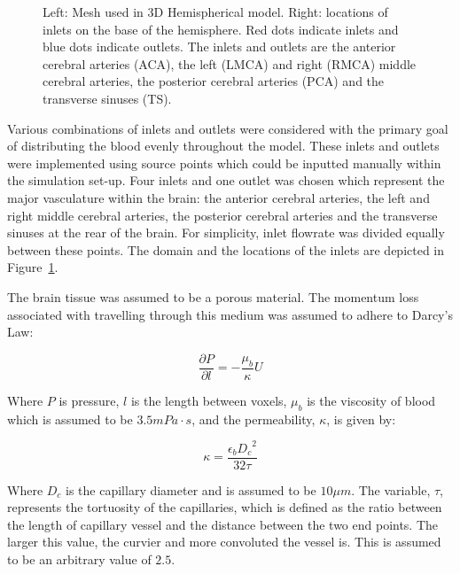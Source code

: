 \documentclass[11pt,english,a4paper,twoside,openright]{report}
\begin{document}
{{{{{{{{\begin{figure}[h]
\begin{subfigure}[b]{0.45\textwidth}
	\end{subfigure}
	\caption[Mesh and domain for 3D hemispherical model with the location of inlets and outlets]{Left: Mesh used in 3D Hemispherical model. Right: locations of inlets on the base of the hemisphere. Red dots indicate inlets and blue dots indicate outlets. The inlets and outlets are the anterior cerebral arteries (ACA), the left (LMCA) and right (RMCA) middle cerebral arteries, the posterior cerebral arteries (PCA) and the transverse sinuses (TS).}
	\label{fig:InletOutlet3DHemisphere}
\end{figure}

Various combinations of inlets and outlets were considered with the primary goal of distributing the blood evenly throughout the model. These inlets and outlets were implemented using source points which could be inputted manually within the simulation set-up. Four inlets and one outlet was chosen which represent the major vasculature within the brain: the anterior cerebral arteries, the left and right middle cerebral arteries, the posterior cerebral arteries and the transverse sinuses at the rear of the brain. For simplicity, inlet flowrate was divided equally between these points. The domain and the locations of the inlets are depicted in Figure~\ref{fig:InletOutlet3DHemisphere}.

The brain tissue was assumed to be a porous material. The momentum loss associated with travelling through this medium was assumed to adhere to Darcy's Law:

\begin{equation}
\frac{\partial P}{\partial l}=-\frac{\mu_{b}}{\kappa}U
\end{equation}

Where $P$ is pressure, $l$ is the length between voxels, $\mu_{b}$ is the viscosity of blood which is assumed to be $3.5mPa{\cdot}s$, and the permeability, $\kappa$, is given by:

\begin{equation}
\kappa = \frac{\epsilon_{b}{D_{c}}^{2}}{32\tau}
\end{equation}

Where $D_{c}$ is the capillary diameter and is assumed to be $10\mu m$. The variable, $\tau$, represents the tortuosity of the capillaries, which is defined as the ratio between the length of capillary vessel and the distance between the two end points. The larger this value, the curvier and more convoluted the vessel is. This is assumed to be an arbitrary value of $2.5$. 

}}}}}}}}
\end{document}
